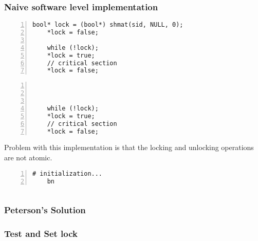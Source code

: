 \documentclass[8pt]{article}
\begin{document}
\subsubsection*{Naive software level implementation}
\begin{minipage}{0.45\linewidth}
\begin{Verbatim}[frame=topline,numbers=left,label= Process 0,framesep=3mm]
    bool* lock = (bool*) shmat(sid, NULL, 0);
    *lock = false;

    while (!lock);
    *lock = true;
    // critical section
    *lock = false;
\end{Verbatim}
\end{minipage}\hfill
\begin{minipage}{0.45\linewidth}
\begin{Verbatim}[frame=topline,numbers=left,label= Process 1,framesep=3mm]



    while (!lock);
    *lock = true;
    // critical section
    *lock = false;
\end{Verbatim}
\end{minipage}\hfill
\par\vspace{3ex}
Problem with this implementation is that the locking and unlocking operations are not atomic.\\
\par\vspace{3ex}
\begin{minipage}{0.45\linewidth}
\begin{Verbatim}[frame=topline,numbers=left,label= Process 1,framesep=3mm]
    # initialization...
    bn
\end{Verbatim}
\end{minipage}\hfill
\begin{minipage}{0.45\linewidth}
\begin{Verbatim}[frame=topline,numbers=left,label= Process 1,framesep=3mm]

\end{Verbatim}
\end{minipage}\hfill
\subsubsection*{Peterson's Solution}

\subsubsection*{Test and Set lock}
\begin{lstlisting}
    
\end{lstlisting}
\end{document}
